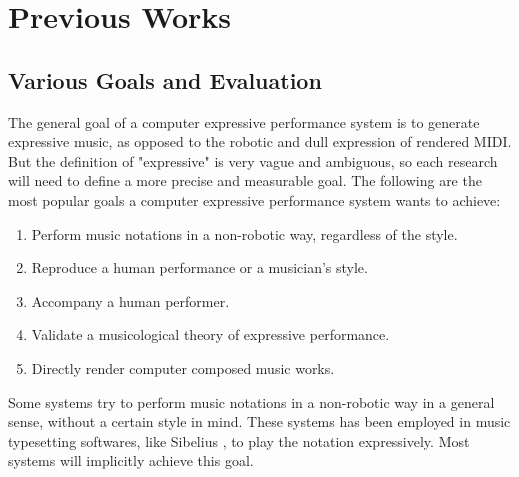 \chapter{Previous Works}
\label{chap:prev}
\section{Various Goals and Evaluation}
The general goal of a computer expressive performance system is to generate expressive music, as opposed to the robotic and dull expression of rendered MIDI. But the definition of "expressive" is very vague and ambiguous, so each research will need to define a more precise and measurable goal. The following are the most popular goals a computer expressive performance system wants to achieve:
\begin{enumerate}
   \item Perform music notations in a non-robotic way, regardless of the style.
   \item Reproduce a human performance or a musician's style.
   \item Accompany a human performer.
   \item Validate a musicological theory of expressive performance.
   \item Directly render computer composed music works.
\end{enumerate}

Some systems try to perform music notations in a non-robotic way in a general sense, without a certain style in mind. These systems has been employed in music typesetting softwares, like Sibelius \cite{sibelius}, to play the notation expressively. Most systems will implicitly achieve this goal.

